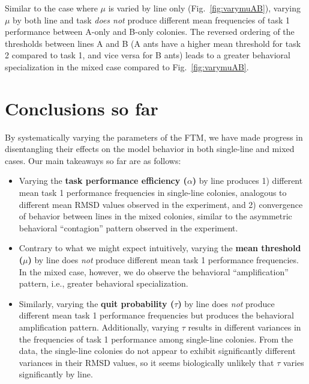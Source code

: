 \documentclass[11pt]{article}
\begin{document}
Similar to the case where $\mu$ is varied by line only (Fig.~\ref{fig:varymuAB}), varying $\mu$ by both line and task \textit{does not} produce different mean frequencies of task 1 performance between A-only and B-only colonies. The reversed ordering of the thresholds between lines A and B (A ants have a higher mean threshold for task 2 compared to task 1, and vice versa for B ants) leads to a greater behavioral specialization in the mixed case compared to Fig.~\ref{fig:varymuAB}.

\section{Conclusions so far}

By systematically varying the parameters of the FTM, we have made progress in disentangling their effects on the model behavior in both single-line and mixed cases. Our main takeaways so far are as follows:

\begin{itemize}
	\item Varying the \textbf{task performance efficiency ($\alpha$)} by line produces 1) different mean task 1 performance frequencies in single-line colonies, analogous to different mean RMSD values observed in the experiment, and 2) convergence of behavior between lines in the mixed colonies, similar to the asymmetric behavioral ``contagion'' pattern observed in the experiment.
	
	\item Contrary to what we might expect intuitively, varying the \textbf{mean threshold ($\mu$)} by line does \textit{not} produce different mean task 1 performance frequencies. In the mixed case, however, we do observe the behavioral ``amplification'' pattern, i.e., greater behavioral specialization.

	\item Similarly, varying the \textbf{quit probability ($\tau$)} by line does \textit{not} produce different mean task 1 performance frequencies but produces the behavioral amplification pattern. Additionally, varying $\tau$ results in different variances in the frequencies of task 1 performance among single-line colonies. 
	From the data, the single-line colonies do not appear to exhibit significantly different variances in their RMSD values,
so it seems biologically unlikely that $\tau$ varies significantly by line.

\end{itemize}
\end{document}
